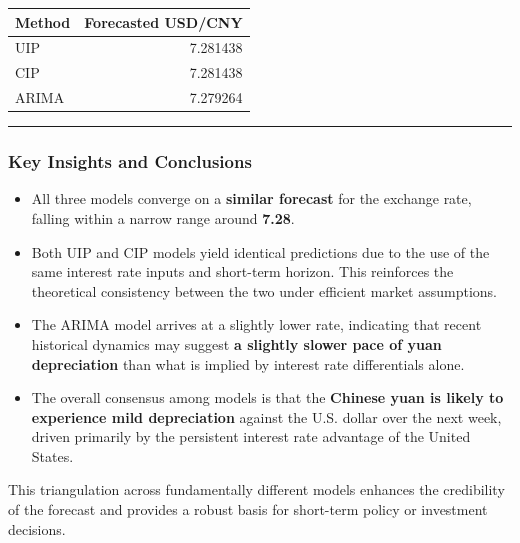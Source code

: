 \documentclass[
]{article}
\providecommand{\tightlist}{%
  \setlength{\itemsep}{0pt}\setlength{\parskip}{0pt}}
\begin{document}
\begin{longtable}[]{@{}lr@{}}
\toprule\noalign{}
Method & Forecasted USD/CNY \\
\midrule\noalign{}
\endhead
\bottomrule\noalign{}
\endlastfoot
UIP & 7.281438 \\
CIP & 7.281438 \\
ARIMA & 7.279264 \\
\end{longtable}

\begin{center}\rule{0.5\linewidth}{0.5pt}\end{center}

\subsubsection{Key Insights and
Conclusions}\label{key-insights-and-conclusions}

\begin{itemize}
\tightlist
\item
  All three models converge on a \textbf{similar forecast} for the
  exchange rate, falling within a narrow range around \textbf{7.28}.
\item
  Both UIP and CIP models yield identical predictions due to the use of
  the same interest rate inputs and short-term horizon. This reinforces
  the theoretical consistency between the two under efficient market
  assumptions.
\item
  The ARIMA model arrives at a slightly lower rate, indicating that
  recent historical dynamics may suggest \textbf{a slightly slower pace
  of yuan depreciation} than what is implied by interest rate
  differentials alone.
\item
  The overall consensus among models is that the \textbf{Chinese yuan is
  likely to experience mild depreciation} against the U.S. dollar over
  the next week, driven primarily by the persistent interest rate
  advantage of the United States.
\end{itemize}

This triangulation across fundamentally different models enhances the
credibility of the forecast and provides a robust basis for short-term
policy or investment decisions.
\end{document}
